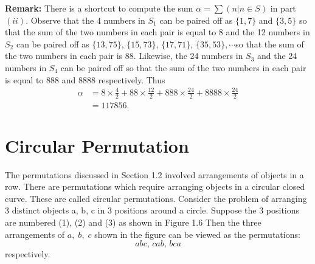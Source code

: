 \documentclass[a4paper,11pt]{book}
\begin{document}
\textbf{Remark:} There is a shortcut to compute the sum $\alpha = \sum( n | n \in S)$ in part $(ii)$. Observe that the 4 numbers in $S_{1}$ can be paired off as $\{1, 7\}$ and $\{3,5\}$ so that the sum of the two numbers in each pair is equal to 8 and the 12 numbers in $S_2$ can be paired off as $\{13,75\}$, $\{15,73\}$, $\{17, 71\}$, $\{35, 53\}, \cdots $so that the sum of the two numbers in each pair is 88. Likewise, the 24 numbers in $S_3$ and the 24 numbers in $S_4$ can be paired off so that the sum of the two numbers in each pair is equal to 888 and 8888 respectively. Thus 
\begin{align*}
\alpha &= 8 \times \frac{4}{2} + 88 \times \frac{12}{2} + 888 \times \frac{24}{2} + 8888\times \frac{24}{2}\\ 
&= 117856. 
\end{align*}
\section{Circular Permutation}
The permutations discussed in Section 1.2 involved arrangements of objects 
in a row. There are permutations which require arranging objects in a 
circular closed curve. These are called circular permutations. 
Consider the problem of arranging 3 distinct objects a, b, c in 3 positions 
around a circle. Suppose the 3 positions are numbered (1), (2) and (3) as 
shown in Figure 1.6 Then the three arrangements of $a,\; b,\; c$ shown in the 
figure can be viewed as the permutations:
\[ abc,\, cab,\, bca \] 
respectively. 
\end{document}
